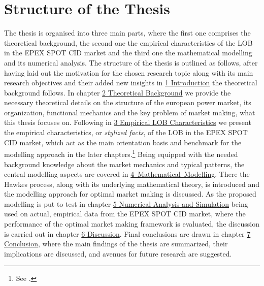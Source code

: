 \documentclass[12pt,a4paper]{cau_thesis}
\begin{document}
\section{Structure of the Thesis}\label{sec:thesis_structure}
The thesis is organised into three main parts, where the first one
comprises the theoretical background, the second one the empirical
characteristics of the LOB in the EPEX SPOT CID market and the third
one the mathematical modelling and its numerical analysis. The
structure of the thesis is outlined as follows, after having laid out
the motivation for the chosen research topic along with its main
research objectives and their added new insights in
\hyperref[ch:introduction]{1 Introduction} the theoretical background
follows. In chapter \hyperref[ch:theoretical_background]{2
    Theoretical Background} we provide the necessary theoretical details
on the structure of the european power market, its organization,
functional mechanics and the key problem of market making, what this
thesis focuses on. Following in
\hyperref[ch:empirical_characteristics]{3 Empirical LOB
    Characteristics} we present the empirical characteristics, or
\textit{stylized facts}, of the LOB in the EPEX SPOT CID market,
which act as the main orientation basis and benchmark for the
modelling approach in the later chapters.\footnote{See
    \cite{jain2024limit}.} Being equipped with the needed background
knowledge about the market mechanics and typical patterns, the
central modelling aspcets are covered in
\mbox{\hyperref[ch:mathematical_modelling]{4 Mathematical
        Modelling}}. There the Hawkes process, along with its underlying
mathematical theory, is introduced and the modelling approach for
optimal market making is discussed. As the proposed modelling is put
to test in chapter \hyperref[ch:numerical_analysis]{5 Numerical
    Analysis and Simulation} being used on actual, empirical data from
the EPEX SPOT CID market, where the performance of the optimal market
making framework is evaluated, the discussion is carried out in
chapter \hyperref[ch:discussion]{6 Discussion}. Final conclusions are
drawn in chapter \hyperref[ch:conclusion]{7 Conclusion}, where the
main findings of the thesis are summarized, their implications are
discussed, and avenues for future research are suggested.

\end{document}
